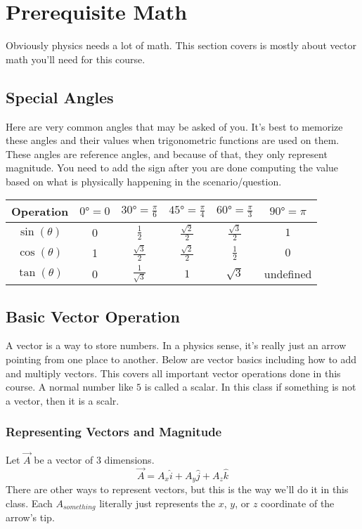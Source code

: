 \section{Prerequisite Math}

Obviously physics needs a lot of math. This section covers is mostly about vector math you'll need for this course.

\subsection{Special Angles}

Here are very common angles that may be asked of you. It's best to memorize these angles and their
values when trigonometric functions are used on them. These angles are reference angles, and because
of that, they only represent magnitude. You need to add the sign after you are done computing the value based
on what is physically happening in the scenario/question.

\begin{center}
\begin{tabular}{| c | c | c | c | c | c |}
    \hline
    Operation & $\ang{0} = 0 $ & $\ang{30} = \frac{\pi}{6}$ & $\ang{45} = \frac{\pi}{4}$ & $\ang{60} = \frac{\pi}{3}$ & $\ang{90} = \pi$ \\
    \hline
    $\sin (\theta)$ & 0 & $\frac{1}2$ & $\frac{\sqrt{2}}{2}$ & $\frac{\sqrt{3}}{2}$ & $1$ \\
    \hline
    $\cos (\theta)$ & 1 & $\frac{\sqrt{3}}{2}$ & $\frac{\sqrt{2}}{2}$ & $\frac{1}2$ & $0$ \\
    \hline
    $\tan (\theta)$ & 0 & $\frac{1}{\sqrt{3}}$ & $1$ & $\sqrt{3}$ & undefined \\
    \hline
\end{tabular}
\end{center}

\subsection{Basic Vector Operation}
A vector is a way to store numbers. In a physics sense, it's really just an arrow pointing from one place to another. Below are vector basics
including how to add and multiply vectors. This covers all important vector operations done in this course. A normal number like \( 5 \) is
called a scalar. In this class if something is not a vector, then it is a scalr.

\subsubsection{Representing Vectors and Magnitude}
Let $\vec{A}$ be a vector of 3 dimensions.
\begin{equation}
    \vec{A} =  A_x \hat{i} + A_y \hat{j} + A_z \hat{k}
\end{equation}
There are other ways to represent vectors, but this is the way we'll do it in this class. Each \(A_{something}\) literally just represents the
$x$, $y$, or $z$ coordinate of the arrow's tip.

